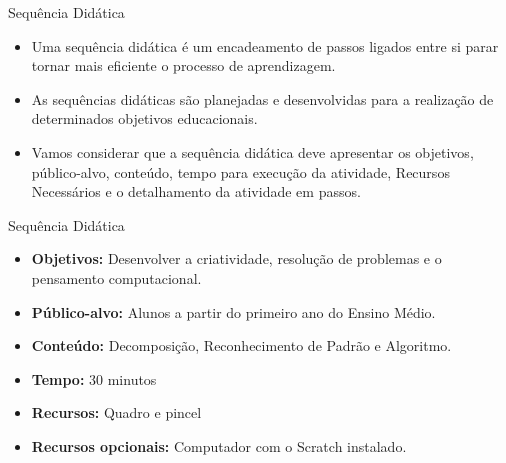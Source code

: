 \documentclass{beamer}
\begin{document}
\begin{frame}{Sequência Didática}

\begin{itemize}
    \item Uma sequência didática é um encadeamento de passos ligados entre si parar tornar mais eficiente o processo de aprendizagem.

\item As sequências didáticas são planejadas e desenvolvidas para a realização de determinados objetivos educacionais.

\item Vamos considerar que a sequência didática deve apresentar os objetivos, público-alvo, conteúdo, tempo para execução da atividade, Recursos Necessários e o detalhamento da atividade em passos.
\end{itemize}    

\end{frame}


\begin{frame}{Sequência Didática}

\begin{itemize}
\item \textbf{Objetivos:} Desenvolver a criatividade, resolução de problemas e o pensamento computacional.

\item \textbf{Público-alvo:}  Alunos a partir do primeiro ano do Ensino Médio.

\item \textbf{Conteúdo:} Decomposição, Reconhecimento de Padrão e Algoritmo.

\item \textbf{Tempo:} 30 minutos

\item \textbf{Recursos:} Quadro e pincel

\item \textbf{Recursos opcionais:} Computador com o Scratch instalado.
\end{itemize}
    
\end{frame}
\end{document}
